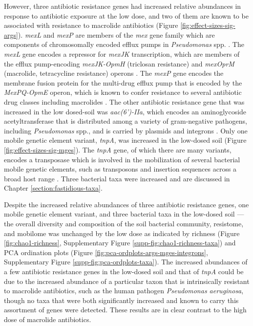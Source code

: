 However, three antibiotic resistance genes had increased relative abundances in response to antibiotic exposure at the low dose, and two of them are known to be associated with resistance to macrolide antibiotics (Figure \ref{fig:effect-sizes-sig-args}).
\textit{mexL} and \textit{mexP} are members of the \textit{mex} gene family which are components of chromosomally encoded efflux pumps in \textit{Pseudomonas} spp. \parencite{Mima.2005, Chuanchuen.2005}.
The \textit{mexL} gene encodes a repressor for \textit{mexJK} transcription, which are members of the efflux pump-encoding \textit{mexJK-OpmH} (triclosan resistance) and \textit{mexOprM} (macrolide, tetracycline resistance) operons \parencite{Chuanchuen.2005}.
The \textit{mexP} gene encodes the membrane fusion protein for the multi-drug efflux pump that is encoded by the \textit{MexPQ-OpmE} operon, which is known to confer resistance to several antibiotic drug classes including macrolides \parencite{Mima.2005}.
The other antibiotic resistance gene that was increased in the low dosed-soil was \textit{aac(6')-IIa}, which encodes an aminoglycoside acetyltransferase that is distributed among a variety of gram-negative pathogens, including \textit{Pseudomonas} spp., and is carried by plasmids and integrons \parencite{Shaw.1989, Partridge.2009}.
Only one mobile genetic element variant, \textit{tnpA}, was increased in the low-dosed soil (Figure \ref{fig:effect-sizes-sig-mges}).
The \textit{tnpA} gene, of which there are many variants, encodes a transposase which is involved in the mobilization of several bacterial mobile genetic elements, such as transposons and insertion sequences across a broad host range \parencite{Partridge.2018}.
Three bacterial taxa were increased and are discussed in Chapter \ref{section:fastidious-taxa}.

Despite the increased relative abundances of three antibiotic resistance genes, one mobile genetic element variant, and three bacterial taxa in the low-dosed soil --- the overall diversity and composition of the soil bacterial community, resistome, and mobilome was unchanged by the low dose as indicated by richness (Figure \ref{fig:chao1-richness}, Supplementary Figure \ref{supp-fig:chao1-richness-taxa}) and PCA ordination plots (Figure \ref{fig:pca-ordplots-args-mges-integrons}, Supplementary Figure \ref{supp-fig:pca-ordplots-taxa}).
The increased abundances of a few antibiotic resistance genes in the low-dosed soil and that of \textit{tnpA} could be due to the increased abundance of a particular taxon that is intrinsically resistant to macrolide antibiotics, such as the human pathogen \textit{Pseudomonas aeruginosa}, though no taxa that were both significantly increased and known to carry this assortment of genes were detected.
These results are in clear contrast to the high dose of macrolide antibiotics.

